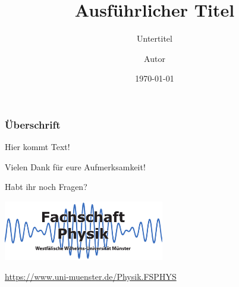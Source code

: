 \documentclass[german, ngerman]{beamer}
\title[Kurzer Titel]{Ausführlicher Titel}
\subtitle{Untertitel}
\author{Autor}
\institute{Fachschaft Physik}
\date{\today}
\begin{document}
\begin{frame}[plain]
	\titlepage
\end{frame}

\begin{frame}
	\frametitle{Überschrift}

	Hier kommt Text!
\end{frame}

\begin{frame}
	\begin{block}{}
		\centering
		Vielen Dank für eure Aufmerksamkeit!
	\end{block}

	\begin{block}{}
		\centering
		Habt ihr noch Fragen?
	\end{block}

	\begin{center}
		\includegraphics[width=7cm]{logo.pdf}

		\medskip
		\url{https://www.uni-muenster.de/Physik.FSPHYS}
	\end{center}
\end{frame}
\end{document}

